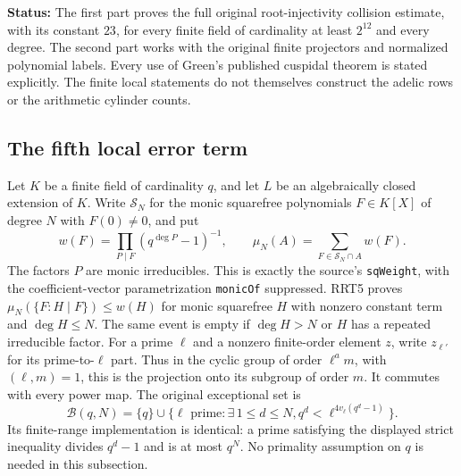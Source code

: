 \documentclass[11pt,a4paper]{article}
\numberwithin{equation}{section}
\theoremstyle{remark}\newtheorem{remark}[theorem]{Remark}
\newcommand{\status}[1]{\textbf{Status:} #1}
\begin{document}
\status{The first part proves the full original root-injectivity
collision estimate, with its constant $23$, for every finite field
of cardinality at least $2^{12}$ and every degree.  The second part
works with the original finite projectors and normalized polynomial
labels.  Every use of Green's published cuspidal theorem is stated
explicitly.  The finite local statements do not themselves construct
the adelic rows or the arithmetic cylinder counts.}

\subsection{The fifth local error term}

Let $K$ be a finite field of cardinality $q$, and let $L$ be an
algebraically closed extension of $K$.  Write $\mathcal S_N$ for the
monic squarefree polynomials $F\in K[X]$ of degree $N$ with
$F(0)\ne0$, and put
\[
 w(F)=\prod_{P\mid F}(q^{\deg P}-1)^{-1},\qquad
 \mu_N(A)=\sum_{F\in\mathcal S_N\cap A}w(F).
 \tag{FLC.1}
\]
The factors $P$ are monic irreducibles.  This is exactly the
source's \texttt{sq\allowbreak Weight}, with the coefficient-vector
parametrization \texttt{monic\allowbreak Of} suppressed.  RRT5 proves
$\mu_N(\{F:H\mid F\})\le w(H)$ for monic squarefree $H$ with
nonzero constant term and $\deg H\le N$.  The same event is empty
if $\deg H>N$ or $H$ has a repeated irreducible factor.
For a prime $\ell$ and a nonzero finite-order element $z$, write
$z_{\ell'}$ for its prime-to-$\ell$ part.  Thus in the cyclic group
of order $\ell^a m$, with $(\ell,m)=1$, this is the projection
onto its subgroup of order $m$.  It commutes with every power map.
The original exceptional set is
\[
 \mathcal B(q,N)=\{q\}\cup
 \{\ell\text{ prime}:\exists\,1\le d\le N,
          q^d<\ell^{4v_\ell(q^d-1)}\}.
 \tag{FLC.2}
\]
Its finite-range implementation is identical: a prime satisfying
the displayed strict inequality divides $q^d-1$ and is at most
$q^N$.  No primality assumption on $q$ is needed in this subsection.

\end{document}
